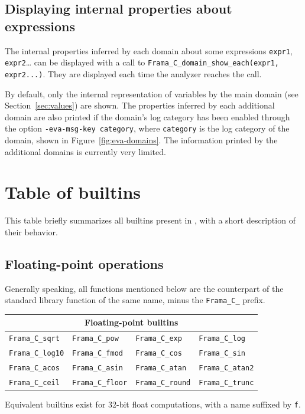 \documentclass{frama-c-book}
\begin{document}
\subsection{Displaying internal properties about expressions}

The internal properties inferred by each domain about some expressions
\lstinline|expr1|, \lstinline|expr2|… can be displayed with a call to
\lstinline|Frama_C_domain_show_each(expr1, expr2...)|. They are displayed each
time the analyzer reaches the call.

By default, only the internal representation of variables by the main domain
(see Section~\ref{sec:values}) are shown. The properties inferred by each
additional domain are also printed if the domain's log category has been enabled
through the option \verb+-eva-msg-key category+, where \verb+category+ is the
log category of the domain, shown in Figure~\ref{fig:eva-domains}. The
information printed by the additional domains is currently very limited.


\section{Table of builtins}
\label{builtins-list}

This table briefly summarizes all builtins present in \Eva{}, with
a short description of their behavior.

\subsection{Floating-point operations}

Generally speaking, all functions mentioned below are the counterpart of the
standard library function of the same name, minus the
\lstinline|Frama_C_| prefix.

\begin{table}[!ht]
  \centering
  \begin{tabular}{llll}
    \multicolumn{4}{c}{Floating-point builtins} \\
    \hline
    \lstinline|Frama_C_sqrt| &
    \lstinline|Frama_C_pow| &
    \lstinline|Frama_C_exp| &
    \lstinline|Frama_C_log| \\
    \lstinline|Frama_C_log10| &
    \lstinline|Frama_C_fmod| &
    \lstinline|Frama_C_cos| &
    \lstinline|Frama_C_sin| \\
    \lstinline|Frama_C_acos| &
    \lstinline|Frama_C_asin| &
    \lstinline|Frama_C_atan| &
    \lstinline|Frama_C_atan2| \\
    \lstinline|Frama_C_ceil| &
    \lstinline|Frama_C_floor| &
    \lstinline|Frama_C_round| &
    \lstinline|Frama_C_trunc|
  \end{tabular}
\end{table}
Equivalent builtins exist for 32-bit float computations, with a name suffixed
by \lstinline|f|.
\end{document}
